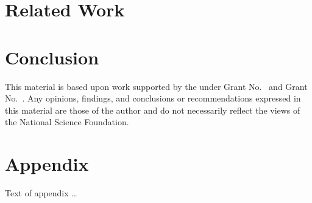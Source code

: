 \documentclass[acmsmall,review,anonymous]{acmart}\settopmatter{printfolios=true,printccs=false,printacmref=false}
\begin{document}
\section{Related Work}

\section{Conclusion}

\begin{acks}                            %
  This material is based upon work supported by the
   under Grant
  No.~ and Grant
  No.~.  Any opinions, findings, and
  conclusions or recommendations expressed in this material are those
  of the author and do not necessarily reflect the views of the
  National Science Foundation.
\end{acks}





\appendix
\section{Appendix}

Text of appendix \ldots
\end{document}

